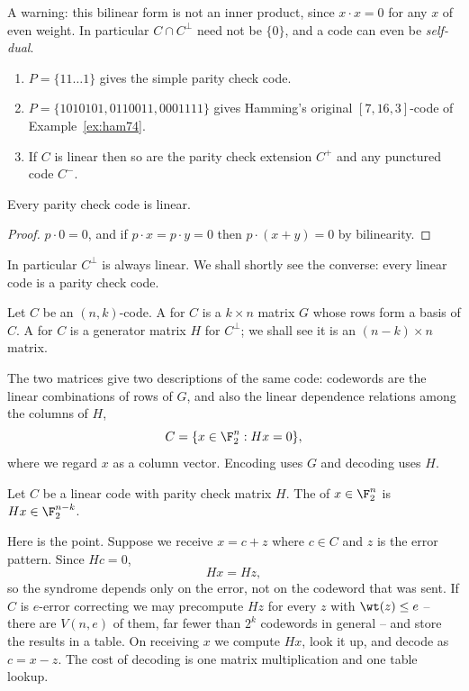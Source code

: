 A warning: this bilinear form is not an inner product, since $x\cdot x = 0$ for any $x$ of even weight. In particular $C \cap C^\perp$ need not be $\{0\}$, and a code can even be \emph{self-dual}.

\begin{example}
	\begin{enumerate}[label=(\roman*)]
		\item $P = \{11\dots1\}$ gives the simple parity check code.
		\item $P = \{1010101, 0110011, 0001111\}$ gives Hamming's original $[7,16,3]$-code of Example~\ref{ex:ham74}.
		\item If $C$ is linear then so are the parity check extension $C^+$ and any punctured code $C^-$.
	\end{enumerate}
\end{example}

\begin{lemma}
	Every parity check code is linear.
\end{lemma}

\begin{proof}
	$p\cdot 0 = 0$, and if $p\cdot x = p\cdot y = 0$ then $p\cdot(x+y) = 0$ by bilinearity.
\end{proof}

In particular $C^\perp$ is always linear. We shall shortly see the converse: every linear code is a parity check code.

\begin{definition}
	Let $C$ be an $(n,k)$-code. A  for $C$ is a $k\times n$ matrix $G$ whose rows form a basis of $C$. A  for $C$ is a generator matrix $H$ for $C^\perp$; we shall see it is an $(n-k)\times n$ matrix.
\end{definition}

The two matrices give two descriptions of the same code: codewords are the linear combinations of rows of $G$, and also the linear dependence relations among the columns of $H$,
$$C = \{x \in \F_2^n : Hx = 0\},$$
where we regard $x$ as a column vector. Encoding uses $G$ and decoding uses $H$.

\begin{definition}[Syndrome]
	Let $C$ be a linear code with parity check matrix $H$. The  of $x \in \F_2^n$ is $Hx \in \F_2^{n-k}$.
\end{definition}

Here is the point. Suppose we receive $x = c + z$ where $c \in C$ and $z$ is the error pattern. Since $Hc = 0$,
$$Hx = Hz,$$
so the syndrome depends only on the error, not on the codeword that was sent. If $C$ is $e$-error correcting we may precompute $Hz$ for every $z$ with $\wt(z)\le e$ -- there are $V(n,e)$ of them, far fewer than $2^k$ codewords in general -- and store the results in a table. On receiving $x$ we compute $Hx$, look it up, and decode as $c = x - z$. The cost of decoding is one matrix multiplication and one table lookup.

